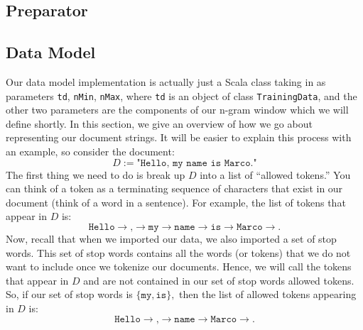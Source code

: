 \documentclass[a4paper,12pt]{article}
\renewcommand{\tt}[1]{\texttt{#1}}
\newcommand{\3}{\left}
\newcommand{\4}{\right}
\renewcommand{\-}[1]{{}^{-#1}}
\begin{document}
\subsection*{Preparator}

\subsection*{Data Model}

Our data model implementation is actually just a Scala class taking in as parameters \tt{td}, \tt{nMin}, \tt{nMax}, where \tt{td} is an object of class \tt{TrainingData}, and the other two parameters are the components of our n-gram window which we will define shortly. In this section, we give an overview of how we go about representing our document strings. It will be easier to explain this process with an example, so consider the document:
$$
D := \tt{"Hello, my name is Marco."}
$$
The first thing we need to do is break up $D$ into a list of \enquote{allowed tokens.} You can think of a token as a terminating sequence of characters that exist in our document (think of a word in a sentence). For example, the list of tokens that appear in $D$ is:
$$
\tt{Hello} \to \tt{,} \to \tt{my} \to \tt{name} \to \tt{is} \to \tt{Marco} \to \tt{.}
$$
Now, recall that when we imported our data, we also imported a set of stop words. This set of stop words contains all the words (or tokens) that we do not want to include once we tokenize our documents. Hence, we will call the tokens that appear in $D$ and are not contained in our set of stop words allowed tokens. So, if our set of stop words is $\{\tt{my}, \tt{is}\},$ then the list of allowed tokens appearing in $D$ is:
$$
\tt{Hello} \to \tt{,} \to \tt{name} \to \tt{Marco} \to \tt{.}
$$
\end{document}
